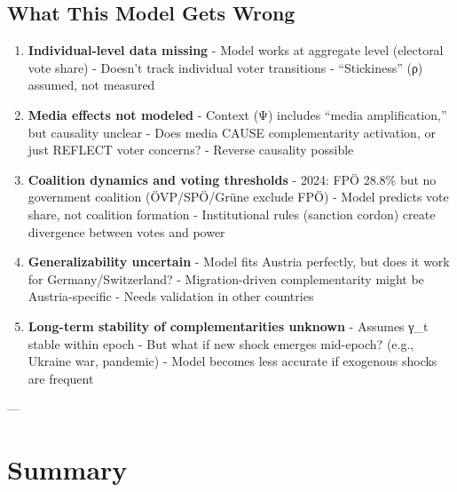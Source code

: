\subsection{What This Model Gets Wrong}

\begin{tcolorbox}[colback=red!5!white, colframe=red!75!black,
    title=Limitations]

\begin{enumerate}

\item \textbf{Individual-level data missing}
   - Model works at aggregate level (electoral vote share)
   - Doesn't track individual voter transitions
   - ``Stickiness'' (ρ) assumed, not measured

\item \textbf{Media effects not modeled}
   - Context (Ψ) includes ``media amplification,'' but causality unclear
   - Does media CAUSE complementarity activation, or just REFLECT voter concerns?
   - Reverse causality possible

\item \textbf{Coalition dynamics and voting thresholds}
   - 2024: FPÖ 28.8\% but no government coalition (ÖVP/SPÖ/Grüne exclude FPÖ)
   - Model predicts vote share, not coalition formation
   - Institutional rules (sanction cordon) create divergence between votes and power

\item \textbf{Generalizability uncertain}
   - Model fits Austria perfectly, but does it work for Germany/Switzerland?
   - Migration-driven complementarity might be Austria-specific
   - Needs validation in other countries

\item \textbf{Long-term stability of complementarities unknown}
   - Assumes γ_t stable within epoch
   - But what if new shock emerges mid-epoch? (e.g., Ukraine war, pandemic)
   - Model becomes less accurate if exogenous shocks are frequent

\end{enumerate}

\end{tcolorbox}

---

\section{Summary}
\label{sec:bs-summary}

